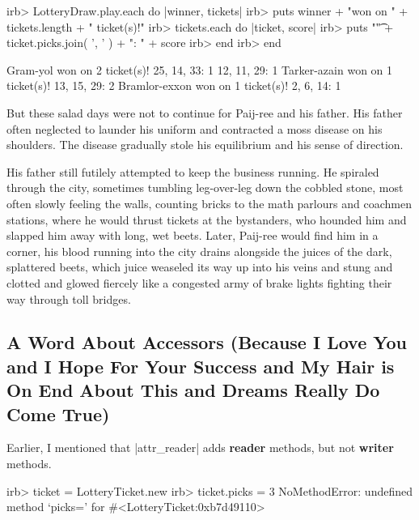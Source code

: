 \documentclass[12pt,twoside]{report}
\begin{document}
\begin{consolecode}

 irb> LotteryDraw.play.each do |winner, tickets|
 irb>   puts winner + "won on " + tickets.length + " ticket(s)!"
 irb>   tickets.each do |ticket, score|
 irb>     puts "\t" + ticket.picks.join( ', ' ) + ": " + score
 irb>   end
 irb> end

\end{consolecode}

\pagebreak

\begin{consolecode}

 Gram-yol won on 2 ticket(s)!
     25, 14, 33: 1
     12, 11, 29: 1
 Tarker-azain won on 1 ticket(s)!
     13, 15, 29: 2
 Bramlor-exxon won on 1 ticket(s)!
     2, 6, 14: 1

\end{consolecode}


But these salad days were not to continue for Paij-ree and his father.
His father often neglected to launder his uniform and contracted a
moss disease on his shoulders.  The disease gradually stole his
equilibrium and his sense of direction.

His father still futilely attempted to keep the business running.  He
spiraled through the city, sometimes tumbling leg-over-leg down the
cobbled stone, most often slowly feeling the walls, counting bricks to
the math parlours and coachmen stations, where he would thrust tickets
at the bystanders, who hounded him and slapped him away with long, wet
beets.  Later, Paij-ree would find him in a corner, his blood running
into the city drains alongside the juices of the dark, splattered
beets, which juice weaseled its way up into his veins and stung and
clotted and glowed fiercely like a congested army of brake lights
fighting their way through toll bridges.



\subsection{A Word About Accessors (Because I Love You and I Hope For
  Your Success and My Hair is On End About This and Dreams Really Do
  Come True)}



Earlier, I mentioned that \rubyinline|attr_reader|
adds {\bf reader} methods, but not {\bf writer} methods.


\begin{consolecode}

 irb> ticket = LotteryTicket.new
 irb> ticket.picks = 3
 NoMethodError: undefined method `picks=' for #<LotteryTicket:0xb7d49110>

\end{consolecode}
\end{document}
